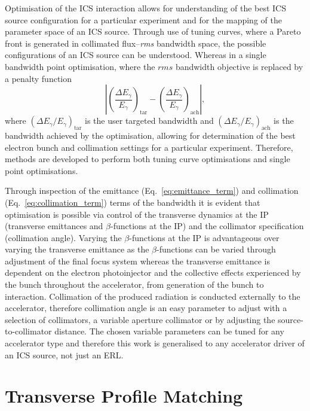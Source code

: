 \documentclass[../main.tex]{subfiles}
\begin{document}
Optimisation of the ICS interaction allows for understanding of the best ICS source configuration for a particular experiment and for the mapping of the parameter space of an ICS source. Through use of tuning curves, where a Pareto front is generated in collimated flux--\textit{rms} bandwidth space, the possible configurations of an ICS source can be understood. Whereas in a single bandwidth point optimisation, where the $\textit{rms}$ bandwidth objective is replaced by a penalty function
\begin{equation}
\left|\left(\frac{\Delta E_{\gamma}}{E_{\gamma}}\right)_{\mathrm{tar}}-\left(\frac{\Delta E_{\gamma}}{E_{\gamma}}\right)_{\mathrm{ach}}\right|,
\label{eq:penalty_function}
\end{equation}
where $\left(\Delta E_{\gamma}/E_{\gamma}\right)_{\mathrm{tar}}$ is the user targeted bandwidth and $\left(\Delta E_{\gamma}/E_{\gamma}\right)_{\mathrm{ach}}$ is the bandwidth achieved by the optimisation, allowing for determination of the best electron bunch and collimation settings for a particular experiment. Therefore, methods are developed to perform both tuning curve optimisations and single point optimisations.

Through inspection of the emittance (Eq.~\ref{eq:emittance_term}) and collimation (Eq.~\ref{eq:collimation_term}) terms of the bandwidth it is evident that optimisation is possible via control of the transverse dynamics at the IP (transverse emittances and $\beta$-functions at the IP) and the collimator specification (collimation angle). Varying the $\beta$-functions at the IP is advantageous over varying the transverse emittance as the $\beta$-functions can be varied through adjustment of the final focus system whereas the transverse emittance is dependent on the electron photoinjector and the collective effects experienced by the bunch throughout the accelerator, from generation of the bunch to interaction. Collimation of the produced radiation is conducted externally to the accelerator, therefore collimation angle is an easy parameter to adjust with a selection of collimators, a variable aperture collimator or by adjusting the source-to-collimator distance. The chosen variable parameters can be tuned for any accelerator type and therefore this work is generalised to any accelerator driver of an ICS source, not just an ERL.

\section{Transverse Profile Matching}
\label{sec:transverse_profile_matching}
\end{document}
